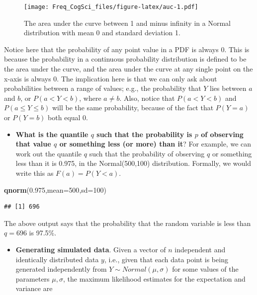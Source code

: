 \documentclass[12pt,]{krantz}
\newenvironment{Shaded}{\begin{snugshade}}{\end{snugshade}}
\newcommand{\DataTypeTok}[1]{\textcolor[rgb]{0.13,0.29,0.53}{#1}}
\newcommand{\DecValTok}[1]{\textcolor[rgb]{0.00,0.00,0.81}{#1}}
\newcommand{\FloatTok}[1]{\textcolor[rgb]{0.00,0.00,0.81}{#1}}
\newcommand{\KeywordTok}[1]{\textcolor[rgb]{0.13,0.29,0.53}{\textbf{#1}}}
\newcommand{\NormalTok}[1]{#1}
\providecommand{\tightlist}{%
  \setlength{\itemsep}{0pt}\setlength{\parskip}{0pt}}
\begin{document}
\begin{figure}
\centering
\texttt{[image: Freq\_CogSci\_files/figure-latex/auc-1.pdf]}
\caption{\label{fig:auc}The area under the curve between 1 and minus infinity in a Normal distribution with mean 0 and standard deviation 1.}
\end{figure}

Notice here that the probability of any point value in a PDF is always 0. This is because the probability in a continuous probability distribution is defined to be the area under the curve, and the area under the curve at any single point on the x-axis is always 0. The implication here is that we can only ask about probabilities between a range of values; e.g., the probability that \(Y\) lies between \(a\) and \(b\), or \(P(a<Y<b)\), where \(a\neq b\). Also, notice that \(P(a<Y<b)\) and \(P(a\leq Y\leq b)\) will be the same probability, because of the fact that \(P(Y=a)\) or \(P(Y=b)\) both equal 0.

\begin{itemize}
\tightlist
\item
  \textbf{What is the quantile \(q\) such that the probability is \(p\) of observing that value \(q\) or something less (or more) than it}? For example, we can work out the quantile \(q\) such that the probability of observing \(q\) or something less than it is 0.975, in the Normal(500,100) distribution. Formally, we would write this as \(F(a)=P(Y<a)\).
\end{itemize}

\begin{Shaded}
\begin{Highlighting}[]
\KeywordTok{qnorm}\NormalTok{(}\FloatTok{0.975}\NormalTok{,}\DataTypeTok{mean=}\DecValTok{500}\NormalTok{,}\DataTypeTok{sd=}\DecValTok{100}\NormalTok{)}
\end{Highlighting}
\end{Shaded}

\begin{verbatim}
## [1] 696
\end{verbatim}

The above output says that the probability that the random variable is less than \(q=696\) is 97.5\%.

\begin{itemize}
\tightlist
\item
  \textbf{Generating simulated data}. Given a vector of \(n\) independent and identically distributed data \(y\), i.e., given that each data point is being generated independently from \(Y \sim Normal(\mu,\sigma)\) for some values of the parameters \(\mu,\sigma\), the maximum likelihood estimates for the expectation and variance are
\end{itemize}
\end{document}
